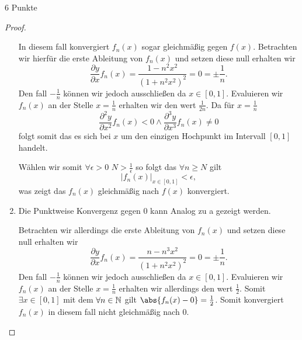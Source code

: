 \documentclass{problemset}
\begin{document}
\begin{problem}{6 Punkte}
\begin{proof}
\begin{enumerate}
              In diesem fall konvergiert \(f_n(x)\) sogar gleichmäßig gegen \(f(x)\).
              Betrachten wir hierfür die erste Ableitung von \(f_n(x)\) und setzen diese null
              erhalten wir \[
                  \frac{\partial y}{\partial x} f_n(x) = \frac{1 - n^2 x^2}{{(1 + n^2 x^2)}^2} = 0 = \pm \frac{1}{n}.
              \]
              Den fall \(-\frac{1}{n}\) können wir jedoch ausschließen da \(x \in
              \left[0,1\right]\). Evaluieren wir \(f_n(x)\) an der Stelle \(x = \frac{1}{n}\)
              erhalten wir den wert \(\frac{1}{2n}\). Da für \(x = \frac{1}{n}\) \[
                  \frac{\partial^2 y}{\partial x^2} f_n(x) < 0 \land \frac{\partial^3 y}{\partial x^3} f_n(x) \neq 0
              \] folgt somit das es sich bei \(x\) um den einzigen Hochpunkt im Intervall
              \(\left[0, 1\right]\) handelt.

              Wählen wir somit \(\forall \epsilon > 0\) \(N > \frac{1}{\epsilon}\) so folgt
              das \(\forall n \ge N\) gilt \[
                  \left| f_n(x) \right|_{x \in [0,1]} < \epsilon,
              \] was zeigt das \(f_n(x)\) gleichmäßig nach \(f(x)\) konvergiert.

        \item Die Punktweise Konvergenz gegen \(0\) kann Analog zu a gezeigt werden.

              Betrachten wir allerdings die erste Ableitung von \(f_n(x)\) und setzen diese
              null erhalten wir \[
                  \frac{\partial y}{\partial x} f_n(x) = \frac{n - n^3 x^2}{{(1 + n^2 x^2)}^2} = 0 = \pm \frac{1}{n}.
              \]
              Den fall \(-\frac{1}{n}\) können wir jedoch ausschließen da \(x \in
              \left[0,1\right]\). Evaluieren wir \(f_n(x)\) an der Stelle \(x = \frac{1}{n}\)
              erhalten wir allerdings den wert \(\frac{1}{2}\). Somit \(\exists x \in [0,1]\)
              mit dem \(\forall n \in \mathbb{N}\) gilt \(\abs{f_n(x) - 0} = \frac{1}{2}\). Somit
              konvergiert \(f_n(x)\) in diesem fall nicht gleichmäßig nach \(0\).
    \end{enumerate}
\end{proof}
\end{problem}
\end{document}
